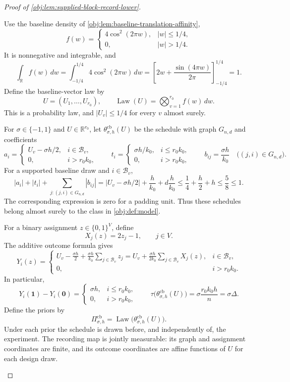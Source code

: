 \documentclass[11pt]{article}
\begin{document}
\begin{proof}[Proof of \cref{obj:lem:supplied-block-record-lower}]
\begin{enumerate}
Use the baseline density of \cref{obj:lem:baseline-translation-affinity},
\[
f(w)=
\begin{cases}
4\cos^2(2\pi w),& |w|\le1/4,\\
0,& |w|>1/4.
\end{cases}
\]
It is nonnegative and integrable, and
\[
\int_{\mathbb R}f(w)\,dw
=
\int_{-1/4}^{1/4}4\cos^2(2\pi w)\,dw
=
\left[2w+\frac{\sin(4\pi w)}{2\pi}\right]_{-1/4}^{1/4}
=1.
\]
Define the baseline-vector law by
\[
U=(U_1,\ldots,U_{r_0}),
\qquad
\operatorname{Law}(U)=\bigotimes_{v=1}^{r_0}f(w)\,dw.
\]
This is a probability law, and \(|U_v|\le1/4\) for every \(v\) almost surely.

For \(\sigma\in\{-1,1\}\) and \(U\in\mathbb R^{r_0}\), let
\(\theta^{\mathrm{cb}}_{\sigma,h}(U)\) be the schedule with graph \(G_{n,d}\) and coefficients
\[
a_i=
\begin{cases}
U_v-\sigma h/2,&i\in\mathcal B_v,\\
0,&i>r_0k_0,
\end{cases}
\qquad
t_i=
\begin{cases}
\sigma h/k_0,&i\le r_0k_0,\\
0,&i>r_0k_0,
\end{cases}
\qquad
b_{ij}=\frac{\sigma h}{k_0}
\quad\bigl((j,i)\in G_{n,d}\bigr).
\]
For a supported baseline draw and \(i\in\mathcal B_v\),
\[
|a_i|+|t_i|+\sum_{j:(j,i)\in G_{n,d}}|b_{ij}|
=
|U_v-\sigma h/2|+\frac{h}{k_0}
+d\frac{h}{k_0}
\le\frac14+\frac h2+h
\le\frac58\le1.
\]
The corresponding expression is zero for a padding unit. Thus these schedules belong almost surely to the class in \cref{obj:def:model}.

For a binary assignment \(z\in\{0,1\}^{V}\), define
\[
X_j(z)=2z_j-1,
\qquad j\in V.
\]
The additive outcome formula gives
\[
Y_i(z)=
\begin{cases}
\displaystyle
U_v-\frac{\sigma h}{2}
+\frac{\sigma h}{k_0}\sum_{j\in\mathcal B_v}z_j
=
U_v+\frac{\sigma h}{2k_0}
\sum_{j\in\mathcal B_v}X_j(z),
&i\in\mathcal B_v,\\[6pt]
0,&i>r_0k_0.
\end{cases}
\]
In particular,
\[
Y_i(\mathbf1)-Y_i(\mathbf0)=
\begin{cases}
\sigma h,&i\le r_0k_0,\\
0,&i>r_0k_0,
\end{cases}
\qquad
\tau\bigl(\theta^{\mathrm{cb}}_{\sigma,h}(U)\bigr)
=
\sigma\frac{r_0k_0h}{n}
=\sigma\Delta.
\]
Define the priors by
\[
\Pi^{\mathrm{cb}}_{\sigma,h}
=
\operatorname{Law}\bigl(\theta^{\mathrm{cb}}_{\sigma,h}(U)\bigr).
\]
Under each prior the schedule is drawn before, and independently of, the experiment. The recording map is jointly measurable: its graph and assignment coordinates are finite, and its outcome coordinates are affine functions of \(U\) for each design draw.


\end{enumerate}
\end{proof}
\end{document}
